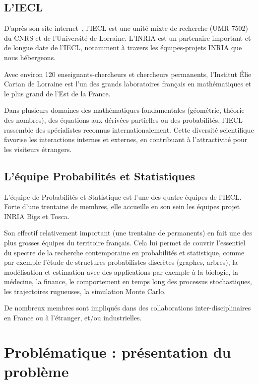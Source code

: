 \documentclass[stage2a]{tnreport}
\begin{document}
\section{L'IECL}

D'après son site internet~\cite{Presentation}, l’IECL est une unité mixte de recherche (UMR 7502) du CNRS et de l’Université de Lorraine. L’INRIA est un partenaire important et de longue date de l’IECL, notamment à travers les équipes-projets INRIA que nous hébergeons.

Avec environ 120 enseignants-chercheurs et chercheurs permanents, l’Institut Élie Cartan de Lorraine est l’un des grands laboratoires français en mathématiques et le plus grand de l’Est de la France.

 Dans plusieurs domaines des mathématiques fondamentales (géométrie, théorie des nombres), des équations aux dérivées partielles ou des probabilités, l’IECL rassemble des spécialistes reconnus internationalement. Cette diversité scientifique favorise les interactions internes et externes, en contribuant à l’attractivité pour les visiteurs étrangers.

\newpage

\section{L'équipe Probabilités et Statistiques}

L’équipe de Probabilités et Statistique est l’une des quatre équipes de l’IECL. Forte d’une trentaine de membres, elle accueille en son sein les équipes projet INRIA Bigs et Tosca.

Son effectif relativement important (une trentaine de permanents) en fait une des plus grosses équipes du territoire français. Cela lui permet de couvrir l’essentiel du spectre de la recherche contemporaine en probabilités et statistique, comme par exemple l’étude de structures probabilistes discrètes (graphes, arbres), la modélisation et estimation avec des applications par exemple à la biologie, la médecine, la finance, le comportement en temps long des processus stochastiques, les trajectoires rugueuses, la simulation Monte Carlo.

De nombreux membres sont impliqués dans des collaborations inter-disciplinaires en France ou à l’étranger, et/ou industrielles.


\newpage


\chapter{Problématique : présentation du problème }
\end{document}

